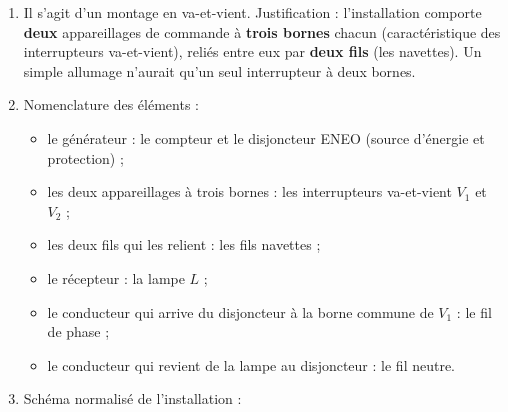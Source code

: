 \documentclass[11pt]{article}
\newcommand{\cle}[1]{{\popxbold\color{popdark}#1}}
\begin{document}
\begin{corrige}
\begin{enumerate}
\item Il s'agit d'un montage en \cle{va-et-vient}. Justification : l'installation comporte \textbf{deux} appareillages de commande à \textbf{trois bornes} chacun (caractéristique des interrupteurs va-et-vient), reliés entre eux par \textbf{deux fils} (les navettes). Un simple allumage n'aurait qu'un seul interrupteur à deux bornes.
\item Nomenclature des éléments :
\begin{itemize}
\item le générateur : le compteur et le disjoncteur ENEO (source d'énergie et protection) ;
\item les deux appareillages à trois bornes : les interrupteurs va-et-vient $V_1$ et $V_2$ ;
\item les deux fils qui les relient : les fils navettes ;
\item le récepteur : la lampe $L$ ;
\item le conducteur qui arrive du disjoncteur à la borne commune de $V_1$ : le fil de phase ;
\item le conducteur qui revient de la lampe au disjoncteur : le fil neutre.
\end{itemize}
\item Schéma normalisé de l'installation :
\end{enumerate}
\begin{popfigure}
\begin{center}
\end{center}
\end{popfigure}
\end{corrige}
\end{document}
